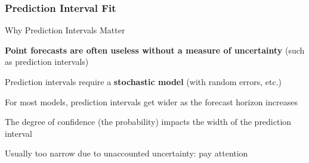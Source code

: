 \documentclass{beamer}
\newenvironment{wideitemize}{\itemize\addtolength{\itemsep}{10pt}}{\enditemize}
\begin{document}
\begin{frame}
  \frametitle{Prediction Interval Fit}
\end{frame}


\begin{frame}{Why Prediction Intervals Matter}
  \begin{wideitemize}
    \item \textbf{Point forecasts are often useless without a measure of uncertainty} (such as prediction intervals)
    \item Prediction intervals require a \textbf{stochastic model} (with random errors, etc.)
    \item For most models, prediction intervals get wider as the forecast horizon increases
    \item The degree of confidence (the probability) impacts the width of the prediction interval
    \item Usually too narrow due to unaccounted uncertainty: pay attention
  \end{wideitemize}  
\end{frame}
\end{document}
